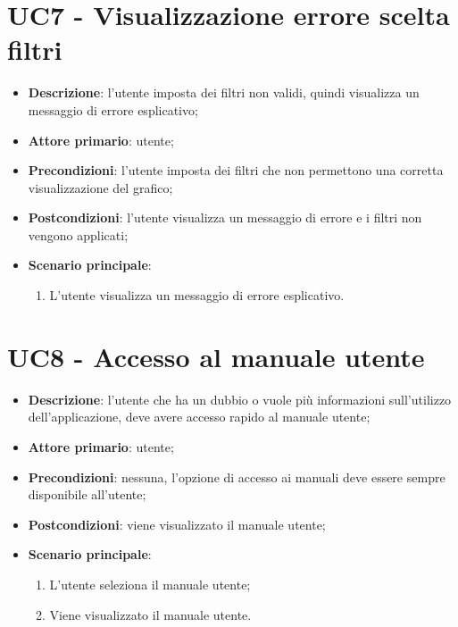 \section{UC7 - Visualizzazione errore scelta filtri}
\begin{itemize}
  \item \textbf{Descrizione}: l'utente imposta dei filtri non validi, quindi visualizza un messaggio di errore esplicativo;
  \item \textbf{Attore primario}: utente;
  \item \textbf{Precondizioni}: l'utente imposta dei filtri che non permettono una corretta visualizzazione del grafico;
  \item \textbf{Postcondizioni}: l'utente visualizza un messaggio di errore e i filtri non vengono applicati;
  \item \textbf{Scenario principale}:
    \begin{enumerate}
      \item L'utente visualizza un messaggio di errore esplicativo.
    \end{enumerate}
\end{itemize}

\section{UC8 - Accesso al manuale utente}
\begin{itemize}
  \item \textbf{Descrizione}: l'utente che ha un dubbio o vuole più informazioni sull'utilizzo dell'applicazione, deve avere accesso rapido al manuale utente;
  \item \textbf{Attore primario}: utente;
  \item \textbf{Precondizioni}: nessuna, l'opzione di accesso ai manuali deve essere sempre disponibile all'utente;
  \item \textbf{Postcondizioni}: viene visualizzato il manuale utente;
  \item \textbf{Scenario principale}:
  \begin{enumerate}
    \item L'utente seleziona il manuale utente;
    \item Viene visualizzato il manuale utente.
  \end{enumerate}
\end{itemize}

